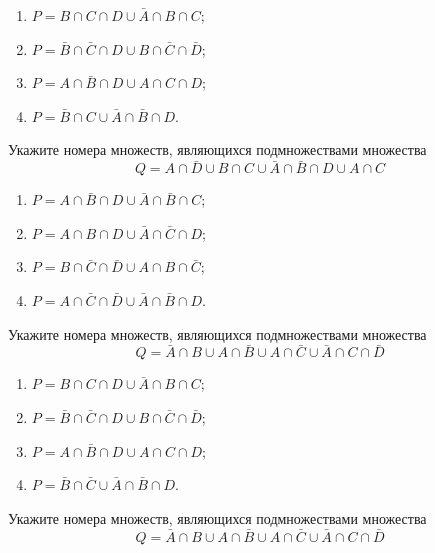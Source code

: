 \documentclass[10pt]{exam}
\begin{document}
\begin{questions}
\begin{enumerate}
	\renewcommand{\labelenumi}{\arabic{enumi})}
	\item $P = B \cap C \cap D \cup \bar{A} \cap B \cap C$;
	\item $P = \bar{B} \cap \bar{C} \cap D \cup B \cap \bar{C} \cap \bar{D}$;
	\item $P = A \cap \bar{B} \cap D \cup A \cap C \cap D$;
	\item $P = \bar{B} \cap C \cup \bar{A} \cap \bar{B} \cap D$.
\end{enumerate}
\question
Укажите номера множеств, являющихся подмножествами множества
\begin{equation*}
	Q = A \cap \bar{D} \cup B \cap C \cup \bar{A} \cap \bar{B} \cap D \cup A \cap C
\end{equation*}

\begin{enumerate}
	\renewcommand{\labelenumi}{\arabic{enumi})}
	\item $P = A \cap \bar{B} \cap D \cup \bar{A} \cap \bar{B} \cap C$;
	\item $P = A \cap B \cap D \cup \bar{A} \cap \bar{C} \cap D$;
	\item $P = B \cap \bar{C} \cap \bar{D} \cup A \cap B \cap \bar{C}$;
	\item $P = A \cap \bar{C} \cap \bar{D} \cup \bar{A} \cap \bar{B} \cap D$.
\end{enumerate}
\question
Укажите номера множеств, являющихся подмножествами множества
\begin{equation*}
	Q = \bar{A} \cap B \cup A \cap \bar{B} \cup A \cap \bar{C} \cup \bar{A} \cap C \cap \bar{D}
\end{equation*}

\begin{enumerate}
	\renewcommand{\labelenumi}{\arabic{enumi})}
	\item $P = B \cap C \cap D \cup \bar{A} \cap B \cap C$;
	\item $P = \bar{B} \cap \bar{C} \cap D \cup B \cap \bar{C} \cap \bar{D}$;
	\item $P = A \cap \bar{B} \cap D \cup A \cap C \cap D$;
	\item $P = \bar{B} \cap \bar{C} \cup \bar{A} \cap \bar{B} \cap D$.
\end{enumerate}
\question
Укажите номера множеств, являющихся подмножествами множества
\begin{equation*}
	Q = \bar{A} \cap B \cup A \cap \bar{B} \cup A \cap \bar{C} \cup \bar{A} \cap C \cap \bar{D}
\end{equation*}


\end{questions}
\end{document}
